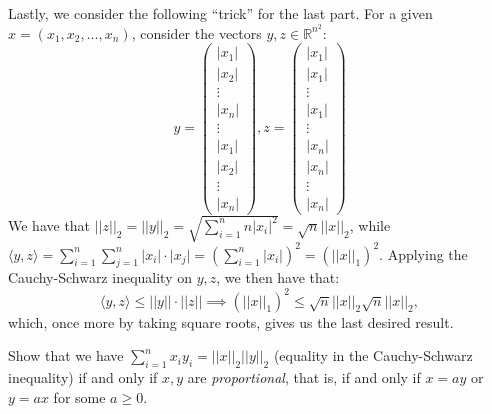 \begin{solution}
    Lastly, we consider the following ``trick'' for the last part.
    For a given $x = (x_1, x_2, \ldots, x_n)$, consider the vectors $y, z \in \mathbb{R}^{n^2}$:
    $$y = \begin{pmatrix}
        \lvert x_1 \rvert \\
        \lvert x_2 \rvert \\
        \vdots \\
        \lvert x_n \rvert \\
        \vdots \\
        \lvert x_1 \rvert \\
        \lvert x_2 \rvert \\
        \vdots \\
        \lvert x_n \rvert
    \end{pmatrix}, z = \begin{pmatrix}
        \lvert x_1 \rvert  \\
        \lvert x_1 \rvert \\
        \vdots \\
        \lvert x_1 \rvert \\
        \vdots \\
        \lvert x_n \rvert \\
        \lvert x_n \rvert\\
        \vdots \\
        \lvert x_n \rvert
    \end{pmatrix}$$
    We have that $\lvert \lvert z \rvert \rvert_2 = \lvert \lvert y \rvert \rvert_2 = \sqrt{\sum_{i=1}^{n} n\lvert x_i \rvert^2 } = \sqrt{n} \lvert \lvert x \rvert \rvert_2$,
    while $\langle y, z \rangle = \sum_{i=1}^{n} \sum_{j=1}^{n} \lvert x_i \rvert \cdot \lvert x_j \rvert = (\sum_{i=1}^{n} \lvert x_i \rvert)^2 = (\lvert \lvert x \rvert \rvert_1)^2$.
    Applying the Cauchy-Schwarz inequality on $y, z$, we then have that:
    $$\langle y, z \rangle \leq \lvert \lvert y \rvert \rvert \cdot \lvert \lvert z \rvert \rvert \implies (\lvert \lvert x \rvert \rvert_1)^2 \leq \sqrt{n} \lvert \lvert x \rvert \rvert_2 \sqrt{n} \lvert \lvert x \rvert \rvert_2,$$
    which, once more by taking square roots, gives us the last desired result.
\end{solution}

\begin{exercise}{19}
    Show that we have $\sum_{i=1}^{n} x_i y_i = \lvert \lvert x \rvert \rvert_2 \lvert \lvert y \rvert \rvert_2$ (equality in the Cauchy-Schwarz inequality) if and only if $x, y$ are \textit{proportional}, that is, if and only if $x = ay$ or $y = ax$ for some $a \geq 0$.
\end{exercise}

